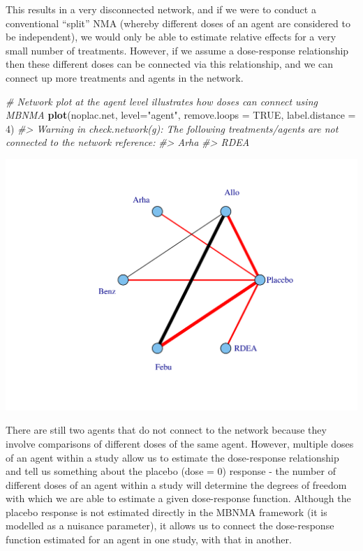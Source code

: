 \documentclass[]{article}
\newenvironment{Shaded}{\begin{snugshade}}{\end{snugshade}}
\newcommand{\CommentTok}[1]{\textcolor[rgb]{0.56,0.35,0.01}{\textit{#1}}}
\newcommand{\DataTypeTok}[1]{\textcolor[rgb]{0.13,0.29,0.53}{#1}}
\newcommand{\DecValTok}[1]{\textcolor[rgb]{0.00,0.00,0.81}{#1}}
\newcommand{\KeywordTok}[1]{\textcolor[rgb]{0.13,0.29,0.53}{\textbf{#1}}}
\newcommand{\NormalTok}[1]{#1}
\newcommand{\OtherTok}[1]{\textcolor[rgb]{0.56,0.35,0.01}{#1}}
\newcommand{\StringTok}[1]{\textcolor[rgb]{0.31,0.60,0.02}{#1}}
\begin{document}
This results in a very disconnected network, and if we were to conduct a
conventional ``split'' NMA (whereby different doses of an agent are
considered to be independent), we would only be able to estimate
relative effects for a very small number of treatments. However, if we
assume a dose-response relationship then these different doses can be
connected via this relationship, and we can connect up more treatments
and agents in the network.

\begin{Shaded}
\begin{Highlighting}[]
\CommentTok{# Network plot at the agent level illustrates how doses can connect using MBNMA}
\KeywordTok{plot}\NormalTok{(noplac.net, }\DataTypeTok{level=}\StringTok{"agent"}\NormalTok{, }\DataTypeTok{remove.loops =} \OtherTok{TRUE}\NormalTok{, }\DataTypeTok{label.distance =} \DecValTok{4}\NormalTok{)}
\CommentTok{#> Warning in check.network(g): The following treatments/agents are not connected to the network reference:}
\CommentTok{#> Arha}
\CommentTok{#> RDEA}
\end{Highlighting}
\end{Shaded}

\includegraphics{mbnmadose_files/figure-latex/unnamed-chunk-30-1.pdf}

There are still two agents that do not connect to the network because
they involve comparisons of different doses of the same agent. However,
multiple doses of an agent within a study allow us to estimate the
dose-response relationship and tell us something about the placebo (dose
= 0) response - the number of different doses of an agent within a study
will determine the degrees of freedom with which we are able to estimate
a given dose-response function. Although the placebo response is not
estimated directly in the MBNMA framework (it is modelled as a nuisance
parameter), it allows us to connect the dose-response function estimated
for an agent in one study, with that in another.
\end{document}
